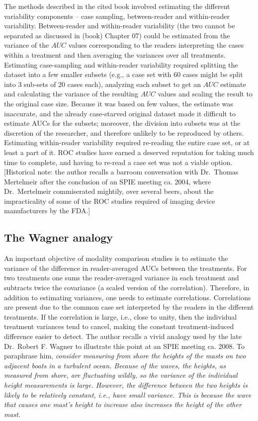 \documentclass[
]{book}
\begin{document}
The methods \citep{RN412} described in the cited book involved estimating the different variability components -- case sampling, between-reader and within-reader variability. Between-reader and within-reader variability (the two cannot be separated as discussed in (book) Chapter 07) could be estimated from the variance of the \(AUC\) values corresponding to the readers interpreting the cases within a treatment and then averaging the variances over all treatments. Estimating case-sampling and within-reader variability required splitting the dataset into a few smaller subsets (e.g., a case set with 60 cases might be split into 3 sub-sets of 20 cases each), analyzing each subset to get an \(AUC\) estimate and calculating the variance of the resulting \(AUC\) values \citep{RN412} and scaling the result to the original case size. Because it was based on few values, the estimate was inaccurate, and the already case-starved original dataset made it difficult to estimate AUCs for the subsets; moreover, the division into subsets was at the discretion of the researcher, and therefore unlikely to be reproduced by others. Estimating within-reader variability required re-reading the entire case set, or at least a part of it. ROC studies have earned a deserved reputation for taking much time to complete, and having to re-read a case set was not a viable option. {[}Historical note: the author recalls a barroom conversation with Dr.~Thomas Mertelmeir after the conclusion of an SPIE meeting ca. 2004, where Dr.~Mertelmeir commiserated mightily, over several beers, about the impracticality of some of the ROC studies required of imaging device manufacturers by the FDA.{]}

\hypertarget{the-wagner-analogy}{%
\subsection{The Wagner analogy}\label{the-wagner-analogy}}

An important objective of modality comparison studies is to estimate the variance of the difference in reader-averaged AUCs between the treatments. For two treatments one sums the reader-averaged variance in each treatment and subtracts twice the covariance (a scaled version of the correlation). Therefore, in addition to estimating variances, one needs to estimate correlations. Correlations are present due to the common case set interpreted by the readers in the different treatments. If the correlation is large, i.e., close to unity, then the individual treatment variances tend to cancel, making the constant treatment-induced difference easier to detect. The author recalls a vivid analogy used by the late Dr.~Robert F. Wagner to illustrate this point at an SPIE meeting ca. 2008. To paraphrase him, \emph{consider measuring from shore the heights of the masts on two adjacent boats in a turbulent ocean. Because of the waves, the heights, as measured from shore, are fluctuating wildly, so the variance of the individual height measurements is large. However, the difference between the two heights is likely to be relatively constant, i.e., have small variance. This is because the wave that causes one mast's height to increase also increases the height of the other mast.}
\end{document}
